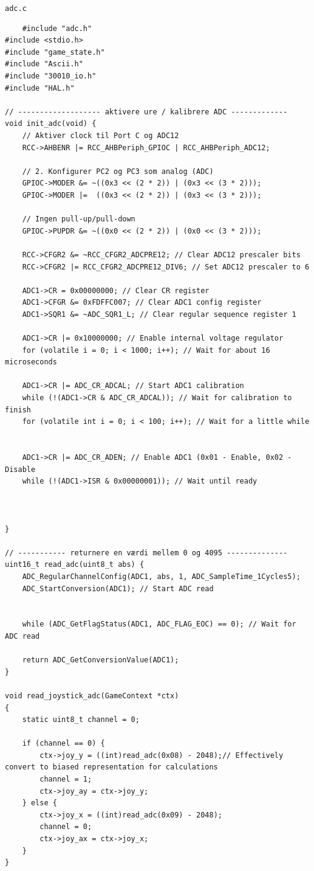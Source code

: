 \texttt{adc.c}
\begin{lstlisting}
    #include "adc.h"
#include <stdio.h>
#include "game_state.h"
#include "Ascii.h"
#include "30010_io.h"
#include "HAL.h"

// ------------------- aktivere ure / kalibrere ADC -------------
void init_adc(void) {
    // Aktiver clock til Port C og ADC12
    RCC->AHBENR |= RCC_AHBPeriph_GPIOC | RCC_AHBPeriph_ADC12;

    // 2. Konfigurer PC2 og PC3 som analog (ADC)
    GPIOC->MODER &= ~((0x3 << (2 * 2)) | (0x3 << (3 * 2)));
    GPIOC->MODER |=  ((0x3 << (2 * 2)) | (0x3 << (3 * 2)));
    
    // Ingen pull-up/pull-down
    GPIOC->PUPDR &= ~((0x0 << (2 * 2)) | (0x0 << (3 * 2)));

    RCC->CFGR2 &= ~RCC_CFGR2_ADCPRE12; // Clear ADC12 prescaler bits
    RCC->CFGR2 |= RCC_CFGR2_ADCPRE12_DIV6; // Set ADC12 prescaler to 6

    ADC1->CR = 0x00000000; // Clear CR register
    ADC1->CFGR &= 0xFDFFC007; // Clear ADC1 config register
    ADC1->SQR1 &= ~ADC_SQR1_L; // Clear regular sequence register 1

    ADC1->CR |= 0x10000000; // Enable internal voltage regulator
    for (volatile i = 0; i < 1000; i++); // Wait for about 16 microseconds
    
    ADC1->CR |= ADC_CR_ADCAL; // Start ADC1 calibration
    while (!(ADC1->CR & ADC_CR_ADCAL)); // Wait for calibration to finish
    for (volatile int i = 0; i < 100; i++); // Wait for a little while


    ADC1->CR |= ADC_CR_ADEN; // Enable ADC1 (0x01 - Enable, 0x02 - Disable
    while (!(ADC1->ISR & 0x00000001)); // Wait until ready
    


}

// ----------- returnere en værdi mellem 0 og 4095 --------------
uint16_t read_adc(uint8_t abs) {
    ADC_RegularChannelConfig(ADC1, abs, 1, ADC_SampleTime_1Cycles5);
    ADC_StartConversion(ADC1); // Start ADC read

  
    while (ADC_GetFlagStatus(ADC1, ADC_FLAG_EOC) == 0); // Wait for ADC read

    return ADC_GetConversionValue(ADC1);
}

void read_joystick_adc(GameContext *ctx)
{
    static uint8_t channel = 0;

    if (channel == 0) {
        ctx->joy_y = ((int)read_adc(0x08) - 2048);// Effectively convert to biased representation for calculations
        channel = 1;
        ctx->joy_ay = ctx->joy_y;
    } else {
        ctx->joy_x = ((int)read_adc(0x09) - 2048);
        channel = 0;
        ctx->joy_ax = ctx->joy_x;
    }
}



\end{lstlisting}

